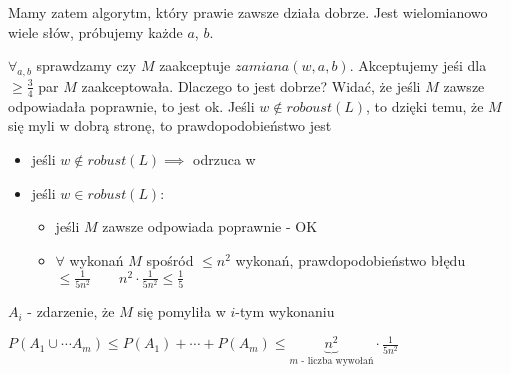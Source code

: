 Mamy zatem algorytm, który prawie zawsze działa dobrze. Jest wielomianowo wiele słów, próbujemy każde $a$, $b$.

$\forall_{a, b}$ sprawdzamy czy $M$ zaakceptuje $zamiana(w, a, b)$. Akceptujemy jeśi dla $\geq \frac{3}{4}$ par $M$ zaakceptowała. Dlaczego to jest dobrze? Widać, że jeśli $M$ zawsze odpowiadała poprawnie, to jest ok. Jeśli $w \not\in roboust(L)$, to dzięki temu, że $M$ się myli w dobrą stronę, to prawdopodobieństwo jest 

\begin{itemize}
    \item jeśli $w \not\in robust(L) \implies$ odrzuca w
    \item jeśli $w \in robust(L)$:
    \begin{itemize}
        \item jeśli $M$ zawsze odpowiada poprawnie - OK
        \item $\forall$ wykonań $M$ spośród $\leq n^2$ wykonań, prawdopodobieństwo błędu $\leq \frac{1}{5n^2} \quad\quad n^2\cdot\frac{1}{5n^2} \leq \frac{1}{5}$
    \end{itemize}
\end{itemize}

$A_i$ - zdarzenie, że $M$ się pomyliła w $i$-tym wykonaniu

$P(A_1 \cup \cdots A_m) \leq P(A_1) + \cdots + P(A_m) \leq \underbrace{n^2}_{m\text{ - liczba wywołań}} \cdot \frac{1}{5n^2}$